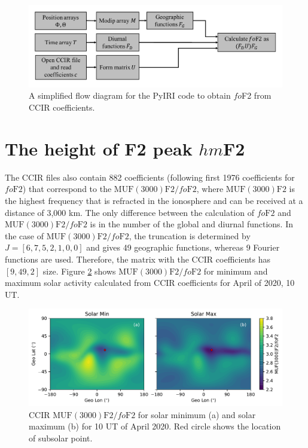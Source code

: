 \documentclass[draft]{agujournal2019}
\begin{document}
\begin{figure}[H]
  \includegraphics[scale=0.5]{PyIRI_flow.pdf}
  \caption{A simplified flow diagram for the PyIRI code to obtain $fo$F2 from CCIR coefficients.}
  \label{fig:PyIRI_flow}
\end{figure}

\section{The height of F2 peak $hm$F2}\label{subsec:hmF2}
The CCIR files also contain 882 coefficients (following first 1976 coefficients for $fo\mathrm{F2}$) that correspond to the $\mathrm{MUF(3000)F2}/fo\mathrm{F2}$, where
$\mathrm{MUF(3000)F2}$ is the highest frequency that is refracted in the ionosphere and can be received at a distance of 3,000 km. The only difference between the calculation of $fo\mathrm{F2}$ and $\mathrm{MUF(3000)F2}/fo\mathrm{F2}$ is in the number of the global and diurnal functions. In the case of $\mathrm{MUF(3000)F2}/fo\mathrm{F2}$, the truncation is determined by $J=[6, 7, 5, 2, 1, 0, 0]$ and gives 49 geographic functions, whereas 9 Fourier functions are used. Therefore, the matrix with the CCIR coefficients has $[9, 49, 2]$ size. Figure \ref{fig:M3000_min_max} shows $\mathrm{MUF(3000)F2}/fo\mathrm{F2}$ for minimum and maximum solar activity calculated from CCIR coefficients for April of 2020, 10 UT. 

\begin{figure}[H]
  \includegraphics[scale=0.7]{PyIRI_M3000_min_max.pdf}
  \caption{CCIR $\mathrm{MUF(3000)F2}/fo\mathrm{F2}$ for solar minimum (a) and solar maximum (b) for 10 UT of April 2020. Red circle shows the location of subsolar point.}
  \label{fig:M3000_min_max}
\end{figure}
\end{document}
